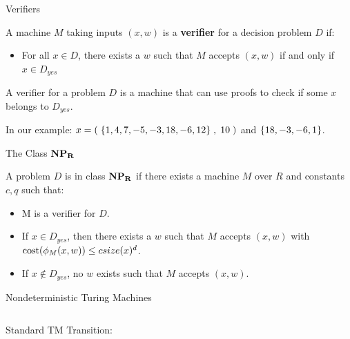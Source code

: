 \documentclass[c]{beamer}
\begin{document}
\begin{frame}{Verifiers}

  A machine $M$ taking inputs $(x, w)$ is a \textbf{verifier} for a decision
  problem $D$ if:

  \begin{itemize}
  \item For all $x \in D$, there exists a $w$ such that $M$ accepts
    $(x, w)$ if and only if $x \in D_{yes}$
  \end{itemize}\pause

  A verifier for a problem $D$ is a machine that can use proofs to
  check if some $x$ belongs to $D_{yes}$.\pause

  \vspace{\baselineskip}

  In our example: $x = (\;\{1,4,7,-5,-3,18,-6,12\}\;, \;10\;)$ and
  $\{18, -3, -6, 1\}$.

\end{frame}

\begin{frame}{The Class $\mathbf{NP_R}$}

  A problem $D$ is in class $\mathbf{NP_R}$ if there exists a machine $M$ over
  $R$ and constants $c, q$ such that:

  \begin{itemize}
    \item M is a verifier for $D$.
    \item If $x \in D_{yes}$, then there exists a $w$ such that $M$
      accepts $(x, w)$ with $\text{cost}(\phi_M(x, w)) \leq c
      size(x)^d$.
    \item If $x \notin D_{yes}$, no $w$ exists such that $M$ accepts
      $(x, w)$.
  \end{itemize}
  
\end{frame}

\begin{frame}{Nondeterministic Turing Machines}

  \begin{columns}

    Standard TM Transition:
       

    \begin{center}
      \detercomptm{}
    \end{center}
  \end{columns}
\end{frame}
\end{document}
